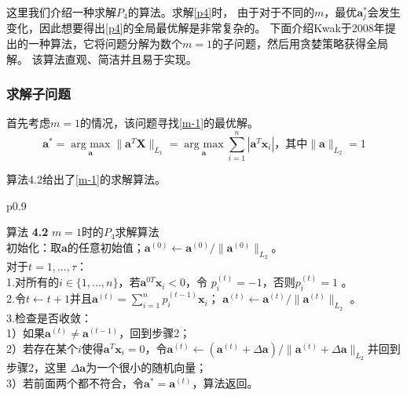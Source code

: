 这里我们介绍一种求解$P_4$的算法。求解\ref{p4}时，
由于对于不同的$m$，最优$\bm a_j^*$会发生变化，因此想要得出\ref{p4}的全局最优解是非常复杂的。
下面介绍Kwak于2008年提出的一种算法\cite{kwak2008principal}，它将问题分解为数个$m=1$的子问题，然后用贪婪策略获得全局解。
该算法直观、简洁并且易于实现。
\subsubsection{求解子问题}

首先考虑$m = 1$的情况，该问题寻找\eqref{m-1}的最优解。
\begin{equation}\label{m-1}
    \bm a^* = \underset{\bm a}{\operatorname{arg\ max}}\| \bm a ^T \bm{X}\|_{L_1}
    = \underset{\bm a}{\operatorname{arg\ max}}\sum_{i=1}^n|\bm a^T\bm x_i|
    \text{，其中}\|\bm a\|_{L_2} = 1
\end{equation}

算法4.2给出了\eqref{m-1}的求解算法。
\begin{table}[H]%
    \centering%
    \begin{tabular}{{p{0.9\columnwidth}}}%
    
    \toprule%
    {\heiti 算法} {\bf 4.2} $m=1$时的$P_4$求解算法\\
    \midrule%
        初始化：取$\bm a$的任意初始值；$\bm a^{(0)}\leftarrow \bm a^{(0)}/\|\bm a^{(0)}\|_{L_2}$。 \\
        对于$t = 1, ..., \tau$：\\
            1.对所有的$i \in \{1, ..., n\}$，若$\bm a^{0T}\bm x_i < 0$，令
            $p_i^{(t)} = -1 $，否则$p_i^{(t)} = 1$ 。\\
            2.令$t \leftarrow t+1$并且$\bm a^{(t)} = \sum_{i=1}^np_i^{(t-1)}\bm x_i$；
            $\bm a^{(t)} \leftarrow \bm a^{(t)}/ \|\bm a^{(t)}\|_{L_2}$ 。\\
            3.检查是否收敛：\\
            1）如果$\bm a^{(t)} \neq \bm a^{(t-1)}$，回到步骤2；\\
            2）若存在某个$i$使得$\bm a^T\bm x_i = 0$，令$\bm a^{(t)} \leftarrow
            (\bm a^{(t)} + \Delta \bm a)/\|\bm a^{(t)} + \Delta \bm a\|_{L_2}$并回到步骤2，这里
            $\Delta \bm a$为一个很小的随机向量； \\
            3）若前面两个都不符合，令$\bm a^* = \bm a^{(t)}$，算法返回。\\
    \bottomrule%
    \end{tabular}
\end{table}%


